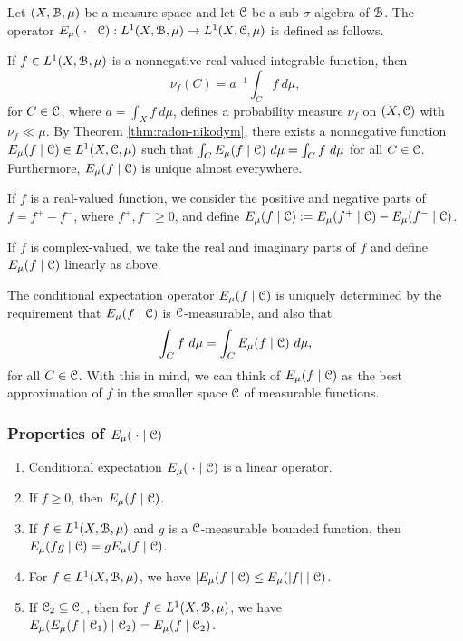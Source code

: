 \begin{definition}
	Let $(X, \mathcal{B}, \mu)$ be a measure space and let $\mathcal{C}$ be a sub-$\sigma$-algebra of $\mathcal{B}$. The  operator $E_\mu(\mathrel{}\cdot\mathrel{} \mid \mathcal{C}) : L^1(X, \mathcal{B}, \mu) \to L^1(X, \mathcal{C}, \mu)$ is defined as follows.
	
	If $f \in L^1(X, \mathcal{B}, \mu)$ is a nonnegative real-valued integrable function, then
	\[
		\nu_f(C) = a^{-1}\int_C{f\ d\mu},
	\]
	for $C \in \mathcal{C}$, where $a = \int_X{f\ d\mu}$, defines a probability measure $\nu_f$ on $(X, \mathcal{C})$ with $\nu_f \ll \mu$. By Theorem \ref{thm:radon-nikodym}, there exists a nonnegative function $E_\mu(f \mid \mathcal{C}) \in L^1(X, \mathcal{C}, \mu)$ such that $\int_C{E_\mu(f \mid \C)\ d\mu} = \int_C{f\ d\mu}$ for all $C \in \mathcal{C}$. Furthermore, $E_\mu(f \mid \mathcal{C})$ is unique almost everywhere.
	
	If $f$ is a real-valued function, we consider the positive and negative parts of $f = f^+ - f^-$, where $f^+, f^- \geq 0$, and define $E_\mu(f \mid \mathcal{C}) := E_\mu(f^+ \mid \mathcal{C}) - E_\mu(f^- \mid \mathcal{C})$.
	
	If $f$ is complex-valued, we take the real and imaginary parts of $f$ and define $E_\mu(f \mid \mathcal{C})$ linearly as above.
\end{definition}

The conditional expectation operator $E_\mu(f \mid \mathcal{C})$ is uniquely determined by the requirement that $E_\mu(f \mid \mathcal{C})$ is $\mathcal{C}$-measurable, and also that
\[
	\int_C{f\ d\mu} = \int_C{E_\mu(f \mid \C)\ d\mu},
\]
for all $C \in \mathcal{C}$. With this in mind, we can think of $E_\mu(f \mid \mathcal{C})$ as the best approximation of $f$ in the smaller space $\mathcal{C}$ of measurable functions.~\cite[Lecture 21]{ergodic-lectures}

\subsubsection{Properties of \texorpdfstring{$E_\mu(\mathrel{}\cdot\mathrel{} \mid \mathcal{C})$}{the conditional expectation operator}}
\begin{enumerate}
	\item Conditional expectation $E_\mu(\mathrel{}\cdot\mathrel{} \mid \mathcal{C})$ is a linear operator. \label{cond-exp:1}
	\item If $f \geq 0$, then $E_\mu(f \mid \mathcal{C})$. \label{cond-exp:2}
	\item If $f \in L^1(X, \mathcal{B}, \mu)$ and $g$ is a $\mathcal{C}$-measurable bounded function, then $E_\mu(fg \mid \mathcal{C}) = gE_\mu(f \mid \mathcal{C})$. \label{cond-exp:3}
	\item For $f \in L^1(X, \mathcal{B}, \mu)$, we have $|E_\mu(f \mid \mathcal{C}) \leq E_\mu(|f| \mid \mathcal{C})$. \label{cond-exp:4}
	\item If $\mathcal{C}_2 \subseteq \mathcal{C}_1$, then for $f \in L^1(X, \mathcal{B}, \mu)$, we have $E_\mu(E_\mu(f \mid \mathcal{C}_1) \mid \mathcal{C}_2) = E_\mu(f \mid \mathcal{C}_2)$. \label{cond-exp:5}
\end{enumerate}

